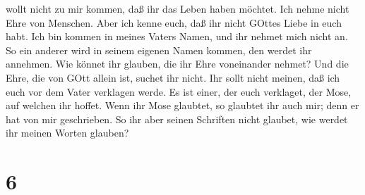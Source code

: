 wollt nicht zu mir kommen, daß ihr das Leben haben möchtet.
 Ich nehme nicht Ehre von Menschen.  Aber ich
kenne euch, daß ihr nicht GOttes Liebe in euch habt.  Ich
bin kommen in meines Vaters Namen, und ihr nehmet mich nicht an. So ein
anderer wird in seinem eigenen Namen kommen, den werdet ihr annehmen.
 Wie könnet ihr glauben, die ihr Ehre voneinander nehmet?
Und die Ehre, die von GOtt allein ist, suchet ihr nicht. 
Ihr sollt nicht meinen, daß ich euch vor dem Vater verklagen werde. Es
ist einer, der euch verklaget, der Mose, auf welchen ihr hoffet.
 Wenn ihr Mose glaubtet, so glaubtet ihr auch mir; denn er
hat von mir geschrieben.  So ihr aber seinen Schriften
nicht glaubet, wie werdet ihr meinen Worten glauben?

\hypertarget{section-5}{%
\section{6}\label{section-5}}

